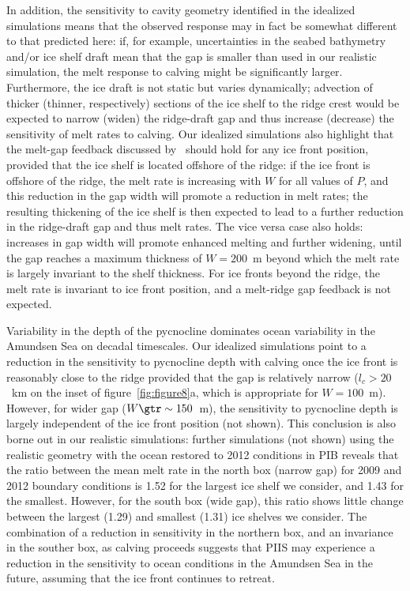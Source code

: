 \documentclass[draft]{agujournal2019}
\begin{document}
In addition, the sensitivity to cavity geometry identified in the idealized simulations means that the observed response may in fact be somewhat different to that predicted here: if, for example, uncertainties in the seabed bathymetry and/or ice shelf draft mean that the gap is smaller than used in our realistic simulation, the melt response to calving might be significantly larger. Furthermore, the ice draft is not static but varies dynamically; advection of thicker (thinner, respectively) sections of the ice shelf to the ridge crest would be expected to narrow (widen) the ridge-draft gap and thus increase (decrease) the sensitivity of melt rates to calving. Our idealized simulations also highlight that the melt-gap feedback discussed by~ should hold for any ice front position, provided that the ice shelf is located offshore of the ridge: if the ice front is offshore of the ridge, the melt rate is increasing with $W$ for all values of $P$, and this reduction in the gap width will promote a reduction in melt rates; the resulting thickening of the ice shelf is then expected to lead to a further reduction in the ridge-draft gap and thus melt rates. The vice versa case also holds: increases in gap width will promote enhanced melting and further widening, until the gap reaches a maximum thickness of $W=200$~m beyond which the melt rate is largely invariant to the shelf thickness. For ice fronts beyond the ridge, the melt rate is invariant to ice front position, and a melt-ridge gap feedback is not expected.

Variability in the depth of the pycnocline dominates ocean variability in the Amundsen Sea on decadal timescales. Our idealized simulations point to a reduction in the sensitivity to pycnocline depth with calving once the ice front is reasonably close to the ridge provided that the gap is relatively narrow ($l_c > 20$~km on the inset of figure~\ref{fig:figure8}a, which is appropriate for $W=100$~m). However, for wider gap ($W \gtr \sim 150$~m), the sensitivity to pycnocline depth is largely independent of the ice front position (not shown). This conclusion is also borne out in our realistic simulations: further simulations (not shown) using the realistic geometry with the ocean restored to 2012 conditions in PIB reveals that the ratio between the mean melt rate in the north box (narrow gap) for 2009 and 2012 boundary conditions is 1.52 for the largest ice shelf we consider, and 1.43 for the smallest. However, for the south box (wide gap), this ratio shows little change between the largest (1.29) and smallest (1.31) ice shelves we consider. The combination of a reduction in sensitivity in the northern box, and an invariance in the souther box, as calving proceeds suggests that PIIS may experience a reduction in the sensitivity to ocean conditions in the Amundsen Sea in the future, assuming that the ice front continues to retreat.
\end{document}
